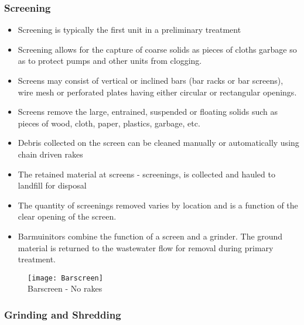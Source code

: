 		\subsubsection{Screening}
					\begin{itemize}
						\item Screening is typically the first unit in a preliminary treatment
						\item Screening allows for the capture of coarse solids as pieces of cloths garbage so as to protect pumps and other units from clogging. 
						\item Screens may consist of vertical or inclined bars (bar racks or bar screens), wire mesh or perforated plates having either circular or rectangular openings. 
						\item Screens remove the large, entrained, suspended or floating solids such as pieces of wood, cloth, paper, plastics, garbage, etc.
						\item Debris collected on the screen can be cleaned manually or automatically using chain driven rakes 
						\item The retained material at screens - screenings, is collected and hauled to landfill for disposal
						\item The quantity of screenings removed varies by location and is a function of the clear opening of the screen.
						\item Barmuinitors combine the function of a screen and a grinder.  The ground material is returned to the wastewater flow for removal during primary treatment.
					\end{itemize}

\begin{figure}
\begin{center}
    \texttt{[image: Barscreen]}\\

Barscreen - No rakes
\end{center}
  \end{figure}
  

		\subsubsection{Grinding and Shredding}

